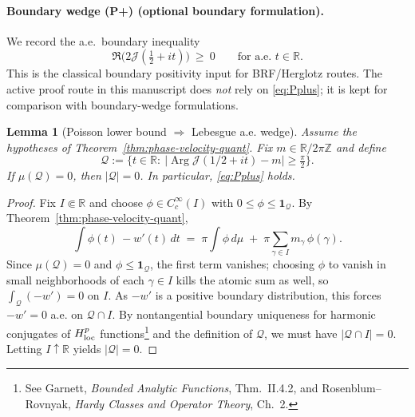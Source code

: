 \documentclass[11pt]{article}
\newtheorem{lemma}[theorem]{Lemma}
\theoremstyle{definition}
\theoremstyle{remark}
\theoremstyle{definition}
\newcommand{\R}{\mathbb{R}}
\DeclareMathOperator{\Arg}{Arg}
\begin{document}
\paragraph{Boundary wedge \textup{(P+)} (optional boundary formulation).}
We record the a.e.\ boundary inequality
\begin{equation}\label{eq:Pplus}
\Re\bigl(2\mathcal J(\tfrac12+it)\bigr)\ \ge\ 0\qquad\text{for a.e.\ }t\in\mathbb R.
\tag{P+}
\end{equation}
This is the classical boundary positivity input for BRF/Herglotz routes. The active proof route in this manuscript does \emph{not} rely on \eqref{eq:Pplus}; it is kept for comparison with boundary-wedge formulations.

\begin{lemma}[Poisson lower bound $\Rightarrow$ Lebesgue a.e. wedge]\label{lem:mu-to-lebesgue}
Assume the hypotheses of Theorem~\ref{thm:phase-velocity-quant}. Fix $m\in\mathbb R/2\pi\mathbb Z$ and define
\[
 \mathcal Q := \bigl\{t\in\mathbb R:\ |\Arg \mathcal J(1/2+it)-m|\ge \tfrac{\pi}{2}\bigr\}.
\]
If $\mu(\mathcal Q)=0$, then $|\mathcal Q|=0$. In particular, \eqref{eq:Pplus} holds.
\end{lemma}
\begin{proof}
Fix $I\Subset\R$ and choose $\phi\in C_c^\infty(I)$ with $0\le\phi\le\mathbf 1_{\mathcal Q}$. By Theorem~\ref{thm:phase-velocity-quant},
\[
  \int \phi(t)\,-w'(t)\,dt \;=\; \pi\!\int\phi\,d\mu \;+\; \pi\!\sum_{\gamma\in I} m_\gamma\,\phi(\gamma).
\]
Since $\mu(\mathcal Q)=0$ and $\phi\le\mathbf 1_{\mathcal Q}$, the first term vanishes; choosing $\phi$ to vanish in small neighborhoods of each $\gamma\in I$ kills the atomic sum as well, so $\int_{\mathcal Q} (-w')=0$ on $I$. As $-w'$ is a positive boundary distribution, this forces $-w'=0$ a.e. on $\mathcal Q\cap I$. By nontangential boundary uniqueness for harmonic conjugates of $H^p_{\rm loc}$ functions\footnote{See Garnett, \emph{Bounded Analytic Functions}, Thm.~II.4.2, and Rosenblum--Rovnyak, \emph{Hardy Classes and Operator Theory}, Ch.~2.} and the definition of $\mathcal Q$, we must have $|\mathcal Q\cap I|=0$. Letting $I\uparrow\R$ yields $|\mathcal Q|=0$.
\end{proof}
\end{document}

